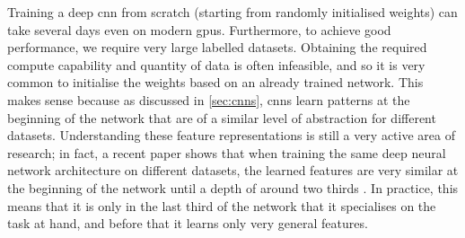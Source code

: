 \documentclass[../report.tex]{subfiles}
\begin{document}
Training a deep \gls{cnn} from scratch (starting from randomly initialised weights) can take several days even on modern \glspl{gpu}. 
Furthermore, to achieve good performance, we require very large labelled datasets.
Obtaining the required compute capability and quantity of data is often infeasible, and so it is very common to initialise the weights based on an already trained network.
This makes sense because as discussed in \cref{sec:cnns}, \glspl{cnn} learn patterns at the beginning of the network that are of a similar level of abstraction for different datasets.
Understanding these feature representations is still a very active area of research; in fact, a recent paper shows that when training the same deep neural network architecture on different datasets, the learned features are very similar at the beginning of the network until a depth of around two thirds \cite{kornblith2019}.
In practice, this means that it is only in the last third of the network that it specialises on the task at hand, and before that it learns only very general features.
\end{document}

